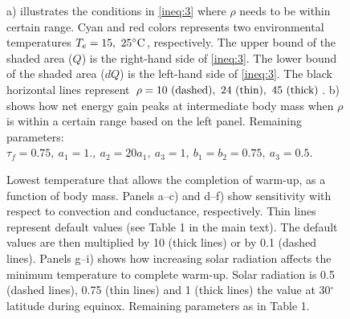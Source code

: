 \documentclass[11pt]{article}
\begin{document}
\begin{figure}
\begin{center}
	\caption{
		\setstretch{\stretchby}
		a) illustrates the conditions in \cref{ineq:3} where $\rho$ needs to be within certain range.
		Cyan and red colors represents two environmental temperatures $T_e = 15, \ 25^\circ \rm{C}$, respectively.
	  The upper bound of the shaded area ($Q$) is the right-hand side of \cref{ineq:3}.
	  The lower bound of the shaded area ($dQ$) is the left-hand side of \cref{ineq:3}.
	  The black horizontal lines represent $\rho = 10 \textnormal{ (dashed)}, \ 24 \textnormal{ (thin)}, \ 45 \textnormal{ (thick)}$.
	  b) shows how net energy gain peaks at intermediate body mass when $\rho$ is within a certain range based on the left panel.
	  Remaining parameters: $\tau_f = 0.75, \ a_1 = 1., \ a_2 = 20 a_1, \ a_3 = 1, \ b_1 = b_2 = 0.75, \ a_3 = 0.5$.
	}
	\label{fig:ana}
\end{center}
\end{figure}

\begin{figure}
	\caption{
		\setstretch{\stretchby}
		Lowest temperature that allows the completion of warm-up, as a function of body mass.
		Panels a--c) and d--f) show sensitivity with respect to convection and conductance, respectively.
		Thin lines represent default values (see Table 1 in the main text).
		The default values are then multiplied by 10 (thick lines) or by 0.1 (dashed lines).
		Panels g--i) shows how increasing solar radiation affects the minimum temperature to complete warm-up.
		Solar radiation is 0.5 (dashed lines), 0.75 (thin lines) and 1 (thick lines) the value at 30$^\circ$ latitude during equinox.
		Remaining parameters as in Table 1.
	}
	\label{fig:min}
\end{figure}
\end{document}
